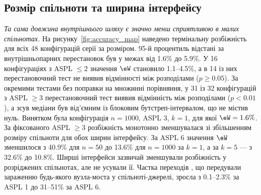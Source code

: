 \subsection{Розмір спільноти та ширина інтерфейсу}
\label{sec:res_size}

\emph{Та сама довжина внутрішнього шляху є значно менш сприятливою в малих спільнотах.} На рисунку~\ref{fig:accuracy_map} наведено термінальну розбіжність для всіх 48 конфігурацій серії за розміром. 95-й процентиль відстані за внутрішньопарних перестановок був у межах від 1.6\% до 5.9\%. У 16 конфігураціях з ASPL $\le2$ значення $\eW$ становило 1.1--4.5\%, а в 14 із них перестановочний тест не виявив відмінності між розподілами ($p\ge0.05$). За окремими тестами без поправки на множинні порівняння, у 31 із 32 конфігурацій з ASPL $\ge3$ перестановочний тест виявив відмінність між розподілами ($p<0.01$), а зсув медіани був від'ємним із блоковим бутстреп-інтервалом, що не містив нуль. Винятком була конфігурація $n=1000$, ASPL 3, $k=1$, для якої $\eW=1.6\%$. За фіксованого ASPL $\ge3$ розбіжність монотонно зменшувалася зі збільшенням розміру спільноти для обох ширин інтерфейсу. За ASPL 6 значення $\eW$ зменшилося з 40.9\% для $n=50$ до 13.6\% для $n=1000$ за $k=1$, а за $k=5$ --- з 32.6\% до 10.8\%. Ширші інтерфейси зазвичай зменшували розбіжність у розріджених спільнотах, але не усували її. Частка переходів \TS{}, що передували зараженню будь-якого вузла-моста у спільноті-джерелі, зросла з 0.1--2.3\% за ASPL 1 до 31--51\% за ASPL 6.

